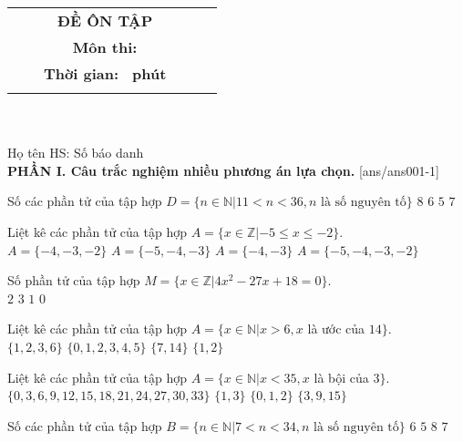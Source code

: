 \documentclass[12pt,a4paper]{article}
\newcommand{\tenso}{}
\newcommand{\tentruong}{}
\newcommand{\tenkythi}{ĐỀ ÔN TẬP}
\newcommand{\tenmonthi}{Môn thi: }
\newcommand{\thoigian}{}
\newcommand{\tieude}[1]{
   \begin{tabular}{cm{3cm}cm{3cm}cm{3cm}}
    {\bf \tenso} & & {\bf \tenkythi} \\
    {\bf \tentruong} & & {\bf \tenmonthi}\\
    && {\bf Thời gian: \bf \thoigian \, phút}\\
    && { \fbox{\bf Mã đề: #1}}
   \end{tabular}\\\\
    
   {Họ tên HS: \dotfill Số báo danh \dotfill}\\
}
\newcommand{\chantrang}[2]{\rfoot{Trang \thepage $-$ Mã đề #2}}
\begin{document}


\tieude{001}
\chantrang{\pageref{LastPage}}{001}
\setcounter{page}{1}
{\bf PHẦN I. Câu trắc nghiệm nhiều phương án lựa chọn.}
\setcounter{ex}{0}
[ans/ans001-1]
\begin{ex}
 Số các phần tử của tập hợp $D=\{n\in \mathbb{N}| 11< n <36, n \text{ là số nguyên tố} \}$ 
\choice
{ ${8}$ }
   { \True ${6}$ }
     { ${5}$ }
    { ${7}$ }
\end{ex}

\begin{ex}
 Liệt kê các phần tử của tập hợp $A=\{x\in \mathbb{Z}|-5 \le x \le -2 \}$. \\ 
\choice
{ $A=\{-4, -3, -2\}$ }
   { $A=\{-5, -4, -3\}$ }
     { $A=\{-4, -3\}$ }
    { \True $A=\{-5, -4, -3, -2\}$ }
\loigiai{ 
  
 }\end{ex}

\begin{ex}
 Số phần tử của tập hợp $M=\{x\in \mathbb{Z}|4 x^{2} - 27 x + 18=0 \}$.\\ 
\choice
{ ${2}$ }
   { ${3}$ }
     { \True ${1}$ }
    { ${0}$ }
\end{ex}

\begin{ex}
 Liệt kê các phần tử của tập hợp $A=\{x\in \mathbb{N}|x >6, x$ là ước của $14\}$. \\ 
\choice
{ $\{1, 2, 3, 6\}$ }
   { $\{0, 1, 2, 3, 4, 5\}$ }
     { \True $\{7, 14\}$ }
    { $\{1, 2\}$ }
\loigiai{ 
  
 }\end{ex}

\begin{ex}
 Liệt kê các phần tử của tập hợp $A=\{x\in \mathbb{N}|x< 35, x$ là bội của $3\}$. \\ 
\choice
{ \True $\{0, 3, 6, 9, 12, 15, 18, 21, 24, 27, 30, 33\}$ }
   { $\{1, 3\}$ }
     { $\{0, 1, 2\}$ }
    { $\{3, 9, 15\}$ }
\loigiai{ 
  
 }\end{ex}

\begin{ex}
 Số các phần tử của tập hợp $B=\{n\in \mathbb{N}| 7< n <34, n \text{ là số nguyên tố} \}$ 
\choice
{ ${6}$ }
   { ${5}$ }
     { ${8}$ }
    { \True ${7}$ }
\end{ex}
\end{document}
